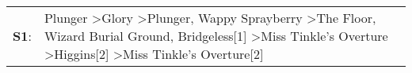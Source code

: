 \begin{supertabular}{p{0.03\textwidth}p{0.92\textwidth}}
 \textbf{S1}:  &  Plunger\textsuperscript{} \textgreater \enspace Glory\textsuperscript{} \textgreater \enspace Plunger\textsuperscript{}, \enspace Wappy Sprayberry\textsuperscript{} \textgreater \enspace The Floor\textsuperscript{}, \enspace Wizard Burial Ground\textsuperscript{}, \enspace Bridgeless[1]\textsuperscript{} \textgreater \enspace Miss Tinkle's Overture\textsuperscript{} \textgreater \enspace Higgins[2]\textsuperscript{} \textgreater \enspace Miss Tinkle's Overture[2]\textsuperscript{}  \enspace  \\
\end{supertabular}
